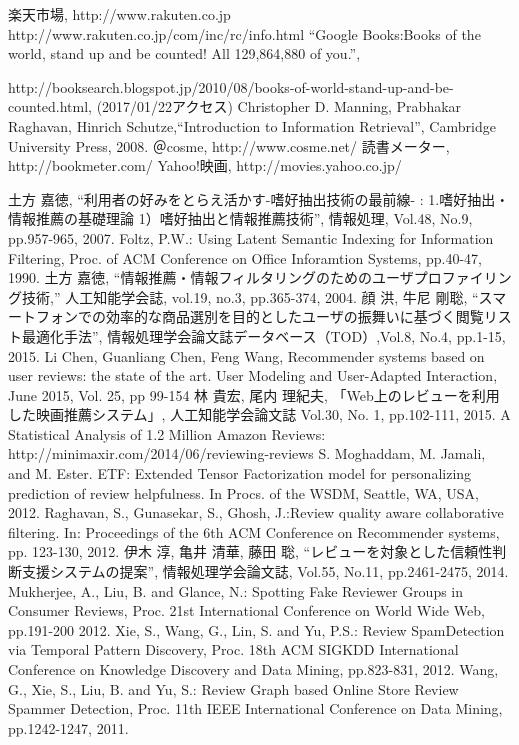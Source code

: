 \documentclass[a4paper,11pt,oneside,openany]{jsbook}
\begin{document}
\begin{thebibliography}{99}
	楽天市場, http://www.rakuten.co.jp
	http://www.rakuten.co.jp/com/inc/rc/info.html
	“Google Books:Books of the world, stand up and be counted! All 129,864,880 of you.”,
	\par
	http://booksearch.blogspot.jp/2010/08/books-of-world-stand-up-and-be-counted.html, (2017/01/22アクセス)
	Christopher D. Manning, Prabhakar Raghavan, Hinrich Schutze,“Introduction to Information Retrieval”, Cambridge University Press, 2008.
	＠cosme, http://www.cosme.net/
	読書メーター, http://bookmeter.com/
	Yahoo!映画, http://movies.yahoo.co.jp/
	
	土方 嘉徳, “利用者の好みをとらえ活かす-嗜好抽出技術の最前線- : 1.嗜好抽出・情報推薦の基礎理論 1）嗜好抽出と情報推薦技術”, 情報処理, Vol.48, No.9, pp.957-965, 2007.
	Foltz, P.W.: Using Latent Semantic Indexing for Information Filtering, Proc. of ACM Conference on Office Inforamtion Systems, pp.40-47, 1990.
	土方 嘉徳, “情報推薦・情報フィルタリングのためのユーザプロファイリング技術,” 人工知能学会誌, vol.19, no.3, pp.365-374, 2004.
	顔 洪, 牛尼 剛聡, “スマートフォンでの効率的な商品選別を目的としたユーザの振舞いに基づく閲覧リスト最適化手法”, 情報処理学会論文誌データベース（TOD）,Vol.8, No.4, pp.1-15, 2015.
	Li Chen, Guanliang Chen, Feng Wang, Recommender systems based on user reviews: the state of the art. User Modeling and User-Adapted Interaction, June 2015, Vol. 25, pp 99-154
	林 貴宏, 尾内 理紀夫, 「Web上のレビューを利用した映画推薦システム」, 人工知能学会論文誌
Vol.30, No. 1, pp.102-111, 2015.
	A Statistical Analysis of 1.2 Million Amazon Reviews: http://minimaxir.com/2014/06/reviewing-reviews
        S. Moghaddam, M. Jamali, and M. Ester. ETF: Extended Tensor Factorization model for personalizing prediction of review helpfulness. In Procs. of the WSDM, Seattle, WA, USA, 2012. 
	Raghavan, S., Gunasekar, S., Ghosh, J.:Review quality aware collaborative filtering. In: Proceedings of the 6th ACM Conference on Recommender systems, pp. 123-130, 2012.
	伊木 淳, 亀井 清華, 藤田 聡, “レビューを対象とした信頼性判断支援システムの提案”, 情報処理学会論文誌, Vol.55, No.11, pp.2461-2475, 2014.
	Mukherjee, A., Liu, B. and Glance, N.: Spotting Fake Reviewer Groups in Consumer Reviews, Proc. 21st International Conference on World Wide Web, pp.191-200 2012.
	Xie, S., Wang, G., Lin, S. and Yu, P.S.: Review SpamDetection via Temporal Pattern Discovery, Proc. 18th ACM SIGKDD International Conference on Knowledge Discovery and Data Mining, pp.823-831, 2012.
	Wang, G., Xie, S., Liu, B. and Yu, S.: Review Graph based Online Store Review Spammer Detection, Proc. 11th IEEE International Conference on Data Mining, pp.1242-1247, 2011.
	

\end{thebibliography}
\end{document}
